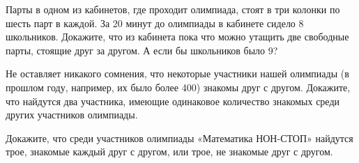 ﻿
\begin{itemize}

\itA Парты в одном из кабинетов, где проходит олимпиада, стоят в три колонки по шесть парт в каждой. За 20 минут до олимпиады в кабинете сидело 8 школьников. Докажите, что из кабинета пока что можно утащить две свободные парты, стоящие друг за другом. А если бы школьников было 9?

\itB Не оставляет никакого сомнения, что некоторые участники нашей олимпиады (в прошлом году, например, их было более 400) знакомы друг с другом. Докажите, что найдутся два участника, имеющие одинаковое количество знакомых среди других участников олимпиады.

\itC Докажите, что среди участников олимпиады «Математика НОН-СТОП» найдутся трое, знакомые каждый друг с другом, или трое, не знакомые друг с другом.
\end{itemize}